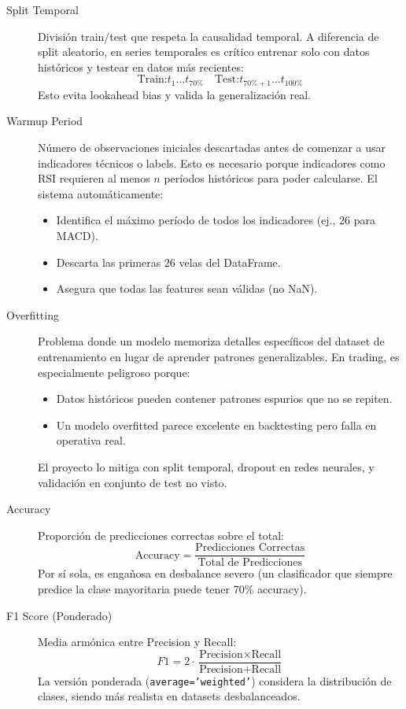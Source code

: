 \begin{description}
    \item[Split Temporal] División train/test que respeta la causalidad temporal. A diferencia de split aleatorio, en series temporales es crítico entrenar solo con datos históricos y testear en datos más recientes:
    $$\text{Train:} t_1 \ldots t_{70\%} \quad \text{Test:} t_{70\%+1} \ldots t_{100\%}$$
    Esto evita lookahead bias y valida la generalización real.

    \item[Warmup Period] Número de observaciones iniciales descartadas antes de comenzar a usar indicadores técnicos o labels. Esto es necesario porque indicadores como RSI requieren al menos $n$ períodos históricos para poder calcularse. El sistema automáticamente:
    \begin{itemize}
        \item Identifica el máximo período de todos los indicadores (ej., 26 para MACD).
        \item Descarta las primeras 26 velas del DataFrame.
        \item Asegura que todas las features sean válidas (no NaN).
    \end{itemize}

    \item[Overfitting] Problema donde un modelo memoriza detalles específicos del dataset de entrenamiento en lugar de aprender patrones generalizables. En trading, es especialmente peligroso porque:
    \begin{itemize}
        \item Datos históricos pueden contener patrones espurios que no se repiten.
        \item Un modelo overfitted parece excelente en backtesting pero falla en operativa real.
    \end{itemize}
    El proyecto lo mitiga con split temporal, dropout en redes neurales, y validación en conjunto de test no visto.

    \item[Accuracy] Proporción de predicciones correctas sobre el total:
    $$\text{Accuracy} = \frac{\text{Predicciones Correctas}}{\text{Total de Predicciones}}$$
    Por sí sola, es engañosa en desbalance severo (un clasificador que siempre predice la clase mayoritaria puede tener 70\% accuracy).

    \item[F1 Score (Ponderado)] Media armónica entre Precision y Recall:
    $$F1 = 2 \cdot \frac{\text{Precision} \times \text{Recall}}{\text{Precision} + \text{Recall}}$$
    La versión ponderada (\texttt{average='weighted'}) considera la distribución de clases, siendo más realista en datasets desbalanceados.


\end{description}
